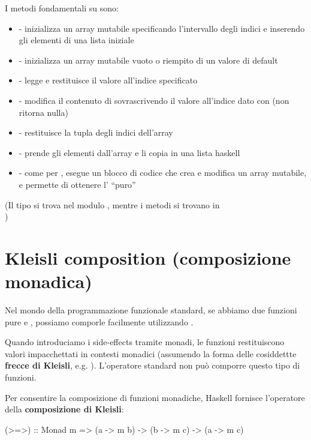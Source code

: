 I metodi fondamentali su  sono:
\begin{itemize}
    \item {} - inizializza un array mutabile specificando l'intervallo degli indici e inserendo gli elementi di una lista iniziale
    \item {} - inizializza un array mutabile vuoto o riempito di un valore di default
    \item {} - legge e restituisce il valore all'indice specificato
    \item {} - modifica il contenuto di  sovrascrivendo il valore all'indice dato con  (non ritorna nulla)
    \item {} - restituisce la tupla  degli indici dell'array
    \item {} - prende gli elementi dall'array e li copia in una lista haskell
    \item {} - come per , esegue un blocco di codice  che crea e modifica un array mutabile, e permette di ottenere l' ``puro''
\end{itemize}

(Il tipo  si trova nel modulo , mentre i metodi si trovano in\\
)

\newpage

\section{Kleisli composition (composizione monadica)}
Nel mondo della programmazione funzionale standard, se abbiamo due funzioni pure  e , possiamo comporle facilmente utilizzando .

Quando introduciamo i side-effects tramite monadi, le funzioni restituiscono valori impacchettati in contesti monadici (assumendo la forma delle cosiddettte \textbf{frecce di Kleisli}, e.g. ). L'operatore standard  non può comporre questo tipo di funzioni.

Per consentire la composizione di funzioni monadiche, Haskell fornisce l'operatore della \textbf{composizione di Kleisli}:
\begin{haskellbox}{}
(>=>) :: Monad m => (a -> m b) -> (b -> m c) -> (a -> m c)
\end{haskellbox}

